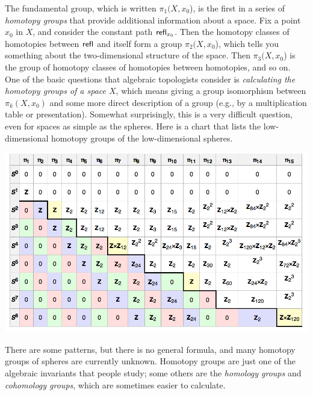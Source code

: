 The fundamental group, which is written $\pi_1(X,x_0$), is the first in
a series of \emph{homotopy groups} that provide additional information
about a space.  Fix a point $x_0$ in $X$, and consider the constant path
$\mathsf{refl}_{x_0}$.  Then the homotopy classes of homotopies between $\mathsf{refl}_{}$ and itself form a
group $\pi_2(X,x_0$), which tells you
something about the two-dimensional structure of the space.  Then
$\pi_3(X,x_0$) is the group of homotopy classes of homotopies between homotopies, and so on.
One of the basic questions that algebraic topologists consider is
\emph{calculating the homotopy groups of a space $X$}, which means
giving a group isomorphism between $\pi_k(X,x_0)$ and some more direct
description of a group (e.g., by a multiplication table or
presentation).  Somewhat surprisingly, this is a very difficult
question, even for spaces as simple as the spheres.  Here is a chart
that lists the low-dimensional homotopy groups of the low-dimensional
spheres.

\includegraphics[width=5.5in]{spheres.jpg}

There are some patterns, but there is no general formula, and many
homotopy groups of spheres are currently unknown.  Homotopy groups are
just one of the algebraic invariants that people study; some others are
the \emph{homology groups} and \emph{cohomology groups}, which are
sometimes easier to calculate.

